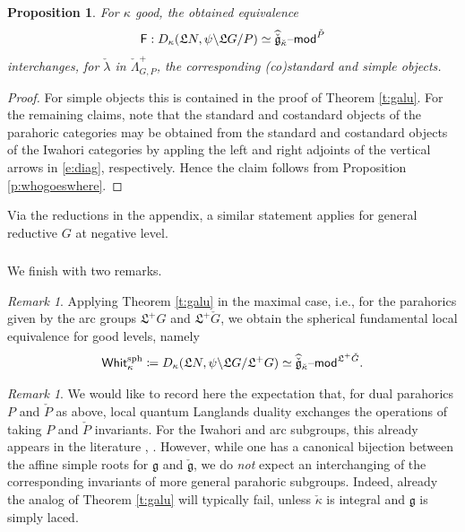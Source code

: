 \documentclass[11pt,reqno]{amsart}
\newcommand{\cgk}{\widehat{\check{\mathfrak{g}}}_{\check{\kappa}}}
\newcommand{\fL}{\mathfrak{L}}
\newcommand{\fg}{\mathfrak{g}}
\newcommand{\on}{\operatorname}
\newtheorem{pro}[subsubsection]{Proposition}
\theoremstyle{remark}
\newtheorem{re}[subsubsection]{Remark}
\numberwithin{equation}{section}
\newcommand{\cG}{\check{G}}
\renewcommand{\mod}{\text{\textendash}\mathsf{mod}}
\newcommand{\Whit}{\mathsf{Whit}}
\begin{document}
\begin{pro} For $\kappa$ good, the obtained equivalence 
	\[ \mathsf{F}: D_\kappa( \fL N, \psi \backslash \fL G / 
	P) \simeq 
	\cgk\mod^{\check{P}} \]
	interchanges, for $\check{\lambda}$ in $\check{\Lambda}^+_{G, P}$, the 
	corresponding (co)standard and simple objects.
	
\end{pro}

\begin{proof} For simple objects this is contained in the proof of Theorem 
	\ref{t:galu}. For the remaining claims, note that the standard and 
	costandard 
	objects of the parahoric categories may be obtained from the standard and 
	costandard objects of the Iwahori categories by appling the left and right 
	adjoints of the vertical arrows in \eqref{e:diag}, respectively. Hence the 
	claim follows from Proposition \ref{p:whogoeswhere}.
\end{proof}
Via the reductions in the appendix, a similar statement applies for 
general 
reductive $G$ at negative level. 

\subsubsection{}
We finish with two remarks.

\begin{re} Applying Theorem \ref{t:galu} in the maximal 
case, i.e., for the parahorics given by the arc groups $\fL^+ G$ and $\fL^+ 
\cG$, we obtain the spherical fundamental local equivalence for good 
levels, namely
%
\[ \Whit_{\kappa}^{\on{sph}} \coloneqq
D_\kappa( \fL N, \psi \backslash \fL G  / \fL ^+ G) \simeq 
\cgk\mod^{\fL^+ \cG}.\]
%
\end{re}

\begin{re} We would like to record here the expectation that, for dual 
parahorics 
$P$ and $\check{P}$ as above, local quantum Langlands duality exchanges the 
operations of taking $P$ and $\check{P}$ invariants. For the Iwahori and arc 
subgroups, this already appears in the literature \cite{campja}, 
\cite{dennispro}. However, while one has a canonical bijection between the 
affine simple roots 
for $\fg$ and $\check{\fg}$, we do {\em not} expect an interchanging of the 
corresponding invariants of more general parahoric subgroups. Indeed, already 
the analog of Theorem \ref{t:galu} will typically fail, unless $\check{\kappa}$ 
is 
integral and $\fg$ is simply laced. 
\end{re}
\end{document}
